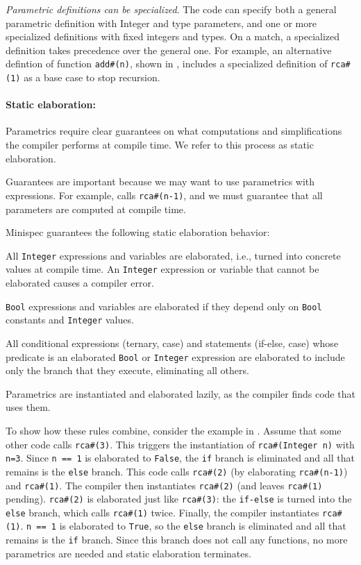 \emph{Parametric definitions can be specialized}.
The code can specify both a general parametric definition with Integer and type parameters,
and one or more specialized definitions with fixed integers and types.
On a match, a specialized definition takes precedence over the general one.
For example, an alternative defintion of function \texttt{add\#(n)}, shown in ,
includes a specialized definition of \texttt{rca\#(1)} as a base case to stop recursion.

\paragraph{Static elaboration:} Parametrics require clear guarantees on what computations
and simplifications the compiler performs at compile time.
We refer to this process as static elaboration.

Guarantees are important because we may want to use parametrics with expressions.
For example,  calls \texttt{rca\#(n-1)},
and we must guarantee that all parameters are computed at compile time.

Minispec guarantees the following static elaboration behavior:
\begin{compactenum}
\item All \texttt{Integer} expressions and variables are elaborated, i.e., turned into concrete values at compile time.
  An \texttt{Integer} expression or variable that cannot be elaborated causes a compiler error.
\item \texttt{Bool} expressions and variables are elaborated if they depend only on \texttt{Bool} constants and \texttt{Integer} values.
\item All conditional expressions (ternary, case) and statements (if-else, case)
  whose predicate is an elaborated \texttt{Bool} or \texttt{Integer} expression are
  elaborated to include only the branch that they execute, eliminating all others.
\item Parametrics are instantiated and elaborated lazily, as the compiler finds code that uses them.
\end{compactenum}

To show how these rules combine, consider the example in
.
Assume that some other code calls \verb|rca#(3)|.
This triggers the instantiation of \verb|rca#(Integer n)| with \verb|n=3|.
Since \verb|n == 1| is elaborated to \verb|False|, the \verb|if| branch is eliminated and all that remains is
the \verb|else| branch.
This code calls \verb|rca#(2)| (by elaborating \verb|rca#(n-1)|) and \verb|rca#(1)|.
The compiler then instantiates \verb|rca#(2)| (and leaves \verb|rca#(1)| pending).
\verb|rca#(2)| is elaborated just like \verb|rca#(3)|: the \verb|if-else| is turned into the \verb|else| branch,
which calls \verb|rca#(1)| twice.
Finally, the compiler instantiates \verb|rca#(1)|.
\verb|n == 1| is elaborated to \verb|True|, so the \verb|else| branch is eliminated and all that remains is the
\verb|if| branch. Since this branch does not call any functions,
no more parametrics are needed and static elaboration terminates.

